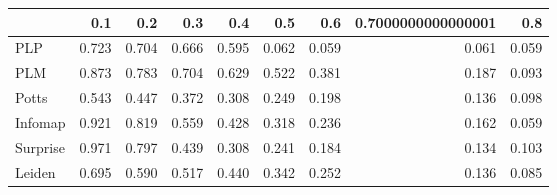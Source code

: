 \begin{tabular}{lrrrrrrrr}
\toprule
{} &   0.1 &   0.2 &   0.3 &   0.4 &   0.5 &   0.6 & 0.7000000000000001 &   0.8 \\
\midrule
PLP      & 0.723 & 0.704 & 0.666 & 0.595 & 0.062 & 0.059 &              0.061 & 0.059 \\
PLM      & 0.873 & 0.783 & 0.704 & 0.629 & 0.522 & 0.381 &              0.187 & 0.093 \\
Potts    & 0.543 & 0.447 & 0.372 & 0.308 & 0.249 & 0.198 &              0.136 & 0.098 \\
Infomap  & 0.921 & 0.819 & 0.559 & 0.428 & 0.318 & 0.236 &              0.162 & 0.059 \\
Surprise & 0.971 & 0.797 & 0.439 & 0.308 & 0.241 & 0.184 &              0.134 & 0.103 \\
Leiden   & 0.695 & 0.590 & 0.517 & 0.440 & 0.342 & 0.252 &              0.136 & 0.085 \\
\bottomrule
\end{tabular}
